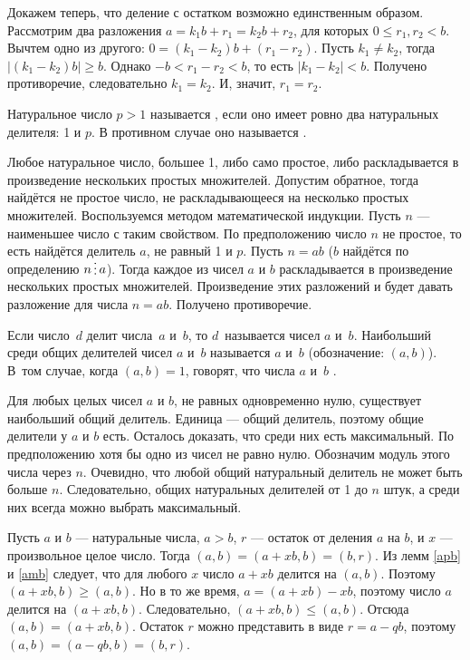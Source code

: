 \documentclass[a4paper,12pt]{article}
\begin{document}
Докажем теперь, что  деление с остатком возможно единственным образом.
Рассмотрим два разложения $a = k_1b + r_1 = k_2b + r_2$, для которых $0\le r_1,r_2 < b$.
Вычтем одно из другого: $0 = (k_1-k_2)b + (r_1-r_2)$. Пусть $k_1\ne k_2$, тогда $|(k_1-k_2)b|\ge b$. Однако $-b<r_1-r_2<b$, то есть $|k_1-k_2|<b$. Получено противоречие, следовательно $k_1=k_2$.
И, значит, $r_1=r_2$.



 Натуральное число $p > 1$ называется , если оно имеет ровно два натуральных делителя: 1 и $p$. В противном случае оно называется .


\label{ppp}
Любое натуральное число, большее 1, либо само простое, либо раскладывается в произведение нескольких простых множителей.
Допустим обратное, тогда найдётся не простое число, не раскладывающееся на несколько простых множителей.
Воспользуемся методом математической индукции. Пусть $n$ --- наименьшее число с таким свойством. По предположению число $n$ не простое, то есть найдётся делитель $a$, не равный 1 и $p$. Пусть $n=ab$ ($b$ найдётся по определению $n\dv a$). Тогда каждое из чисел $a$ и $b$ раскладывается в произведение нескольких простых множителей.
Произведение этих разложений и будет давать разложение для числа $n=ab$. Получено противоречие.

\newpage
{}
Если число~$d$ делит числа~$a$ и~$b$, то $d$~называется  чисел $a$ и~$b$. Наибольший среди общих делителей чисел $a$ и~$b$ называется  $a$ и~$b$ (обозначение: $(a,b)$). В~том случае, когда $(a,b)=1$, говорят, что числа $a$ и~$b$ .

\label{nod1}
Для любых целых чисел $a$ и $b$, не равных одновременно нулю, существует наибольший общий делитель.
Единица --- общий делитель, поэтому общие делители у $a$ и $b$ есть. Осталось доказать, что среди них есть максимальный.
По предположению хотя бы одно из чисел не равно нулю. Обозначим модуль этого числа через $n$.
Очевидно, что любой общий натуральный делитель не может быть больше $n$.
Следовательно, общих натуральных делителей от 1 до $n$ штук, а среди них всегда можно выбрать максимальный.

\label{nodost}
Пусть $a$ и $b$ --- натуральные числа, $a>b$, $r$ --- остаток от деления $a$ на $b$, и $x$ --- произвольное целое число.
Тогда $(a,b) = (a+xb,b) = (b,r)$.
Из лемм \ref{apb} и \ref{amb} следует, что для любого $x$ число $a+xb$ делится на $(a,b)$. Поэтому $(a+xb,b)\ge(a,b)$.
Но в то же время, $a= (a+xb) - xb$, поэтому число $a$ делится на $(a+xb,b)$. Следовательно, $(a+xb,b)\le(a,b)$.
Отсюда $(a,b) = (a+xb,b)$. Остаток $r$ можно представить в виде $r = a - qb$, поэтому $(a,b) = (a-qb,b) = (b,r)$.
\end{document}
